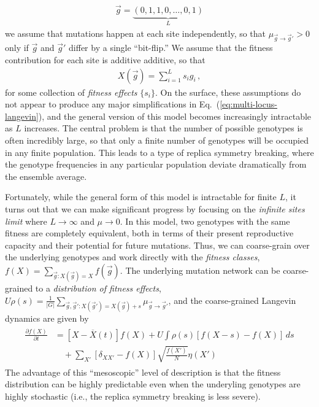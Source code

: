 \documentclass[11pt]{article}
\newcommand{\eq}[1]{Eq.~(\ref{#1})}
\begin{document}
\begin{align}
\vec{g} = \underbrace{(0,1,1,0,\ldots,0,1) }_{L} 
\end{align}
we assume that mutations happen at each site independently, so that $\mu_{\vec{g} \to \vec{g}'} > 0$ only if $\vec{g}$ and $\vec{g}'$ differ by a single ``bit-flip.'' We assume that the fitness contribution for each site is additive additive, so that 
\begin{align}
X(\vec{g}) = \sum_{i=1}^{L} s_i g_i \, , 
\end{align}
for some collection of \emph{fitness effects} $\{ s_i \}$. On the surface, these assumptions do not appear to produce any major simplifications in \eq{eq:multi-locus-langevin}, and the general version of this model becomes increasingly intractable as $L$ increases. The central problem is that the number of possible genotypes is often incredibly large, so that only a finite number of genotypes will be occupied in any finite population. This leads to a type of replica symmetry breaking, where the genotype frequencies in any particular population deviate dramatically from the ensemble average.  

Fortunately, while the general form of this model is intractable for finite $L$, it turns out that we can make significant progress by focusing on the \emph{infinite sites limit} where  $L \to \infty$ and $\mu \to 0$. In this model, two genotypes with the same fitness are completely equivalent, both in terms of their present reproductive capacity and their potential for future mutations. Thus, we can coarse-grain over the underlying genotypes and work directly with the \emph{fitness classes}, $f(X) = \sum_{\vec{g} : X(\vec{g}) = X} f(\vec{g})$. The underlying mutation network can be coarse-grained to a \emph{distribution of fitness effects}, $U \rho(s) = \frac{1}{|G|} \sum_{\vec{g},\vec{g}': X(\vec{g}') = X(\vec{g})+s} \mu_{\vec{g} \to \vec{g}'}$, and the coarse-grained Langevin dynamics are given by  
\begin{align}
\label{eq:fitness-class-langevin}
\begin{aligned}
\frac{\partial f(X)}{\partial t} & = \left[ X-\overline{X}(t) \right] f(X) + U \int \rho(s) \left[ f(X-s) - f(X) \right] \, ds \\
	& \quad + \sum_{X'} \left[ \delta_{XX'} - f(X) \right] \sqrt{\frac{f(X')}{N}} \eta(X')   
\end{aligned}
\end{align}
The advantage of this ``mesoscopic'' level of description is that the fitness distribution can be highly predictable even when the underyling genotypes are highly stochastic (i.e., the replica symmetry breaking is less severe). 
\end{document}
